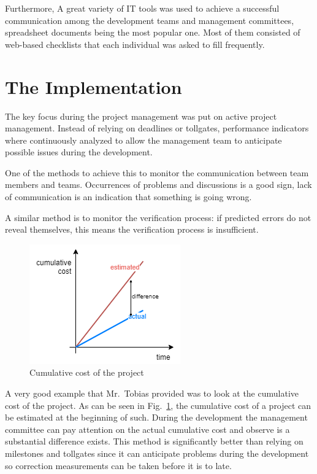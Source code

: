 \documentclass[journal]{IEEEtran}
\begin{document}
Furthermore, A great variety of IT tools was used to achieve a successful communication among the development teams and management committees, spreadsheet documents being the most popular one. Most of them consisted of web-based checklists that each individual was asked to fill frequently.

\section{The Implementation}
The key focus during the project management was put on active project management. Instead of relying on deadlines or tollgates, performance indicators where continuously analyzed to allow the management team to anticipate possible issues during the development. 

One of the methods to achieve this to monitor the communication between team members and teams. Occurrences of problems and discussions is a good sign, lack of communication is an indication that something is going wrong. 

A similar method is to monitor the verification process: if predicted errors do not reveal themselves, this means the verification process is insufficient. 

\begin{figure}[h]
    \centering
    \includegraphics[width=0.8\linewidth]{cost.png}
    \caption{Cumulative cost of the project}
    \label{fig:cost}
\end{figure}

A very good example that Mr.~Tobias provided was to look at the cumulative cost of the project. As can be seen in Fig.~\ref{fig:cost}, the cumulative cost of a project can be estimated at the beginning of such. During the development the management committee can pay attention on the actual cumulative cost and observe is a substantial difference exists. This method is significantly better than relying on milestones and tollgates since it can anticipate problems during the development so correction measurements can be taken before it is to late.
\end{document}
